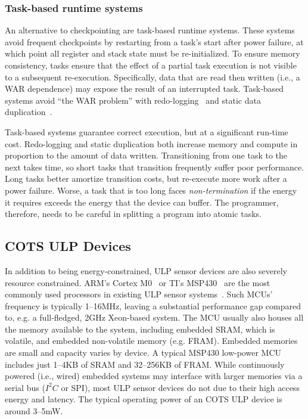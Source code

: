 \subsubsection{Task-based runtime systems}
\label{chapter:background:intermittent:task}
An alternative to checkpointing are task-based runtime systems.
% 
These systems avoid frequent checkpoints by
restarting from a task's start after power failure,
at which point all register and stack state must be re-initialized.
% 
To ensure memory consistency, tasks ensure that the effect of a
partial task execution is not visible to a subsequent re-execution.
Specifically, data that are read then written (i.e., a WAR dependence) may expose the result of an interrupted task.
% 
Task-based systems avoid ``the WAR problem'' with
redo-logging~\cite{alpaca} and static data duplication~\cite{chain}.


Task-based systems guarantee correct execution, but at a significant run-time cost.
% 
Redo-logging and static duplication both increase memory and compute
in proportion to the amount of data written.
% 
Transitioning from one task to the next takes time, so
short tasks that transition frequently suffer poor performance.
Long tasks better amortize transition costs,
but re-execute more work after a power failure.
% 
Worse, a task that is too long faces {\em non-termination} if the energy it
requires exceeds the energy that the device can buffer.
% 
The programmer, therefore, needs to be careful in splitting a program into atomic tasks.

\subsection{COTS ULP Devices}
In addition to being energy-constrained, ULP sensor devices are also severely resource constrained.
% 
ARM's Cortex M0~\cite{cortexm0} or TI's MSP430~\cite{msp430fr5994} are 
the most commonly used processors in existing ULP sensor
systems~\cite{wisp,capybara,flicker,ufop,amulet,wolverine}.
%
Such MCUs' frequency is typically 1--16MHz, leaving a
substantial performance gap compared to, e.g. a full-fledged, 2GHz Xeon-based
system.  
%
The MCU usually also houses all the memory available to
the system, including embedded SRAM, which is volatile, and embedded non-volatile memory (e.g. FRAM).  
%
Embedded memories are small and capacity varies by device. 
% 
A typical MSP430
low-power MCU includes just 1--4KB of SRAM and 32--256KB of FRAM.
% 
While
continuously powered (i.e., wired) embedded systems may interface with larger memories
via a serial bus ($I^{2}C$ or SPI), most ULP sensor devices do
not due to their high access energy and latency.
%
The typical operating power of an COTS ULP device is around 3--5mW.

